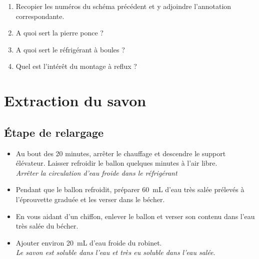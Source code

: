 \documentclass[a4paper,11pt,fleqn]{article}%
\begin{document}
\begin{enumerate}[resume]
	\item Recopier les numéros du schéma précédent et y adjoindre l'annotation correspondante.
	\item A quoi sert la pierre ponce ?
	\item A quoi sert le réfrigérant à boules ?
	\item Quel est l'intérêt du montage à reflux ?
\end{enumerate}
\newpage
\section{Extraction du savon}
	\subsection{Étape de relargage}
	\begin{itemize}
		\item Au bout des 20 minutes, arrêter le chauffage et descendre le support élévateur. Laisser refroidir le ballon quelques minutes à l'air libre.\\
		\emph{Arrêter la circulation d'eau froide dans le réfrigérant}
		\item Pendant que le ballon refroidit, préparer \SI{60}{mL} d'eau très salée prélevés à l'éprouvette graduée et les verser dans le bécher.
		\item En vous aidant d'un chiffon, enlever le ballon et verser son contenu dans l'eau très salée du bécher.
		\item Ajouter environ \SI{20}{mL} d'eau froide du robinet.\\
		\emph{Le savon est soluble dans l'eau et très eu soluble dans l'eau salée}.
	\end{itemize}
\end{document}

